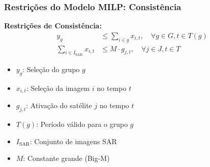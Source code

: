 \documentclass{beamer}
\begin{document}
\begin{frame}
    \frametitle{Restrições do Modelo MILP: Consistência}
    
    \textbf{Restrições de Consistência:}
    {\small \begin{align}
        y_g &\leq \sum_{i \in g} x_{i,t}, \quad \forall g \in G, t \in T(g) \\
        \sum_{i \in I_{\text{SAR}}} x_{i,t} &\leq M \cdot g_{j,t}, \quad \forall j \in J, t \in T
    \end{align}}
    \begin{itemize}\setlength{\itemsep}{0pt}\small
        \item $y_g$: Seleção do grupo $g$
        \item $x_{i,t}$: Seleção da imagem $i$ no tempo $t$
        \item $g_{j,t}$: Ativação do satélite $j$ no tempo $t$
        \item $T(g)$: Período válido para o grupo $g$
        \item $I_{\text{SAR}}$: Conjunto de imagens SAR
        \item $M$: Constante grande (Big-M)
    \end{itemize}
\end{frame}
\end{document}
